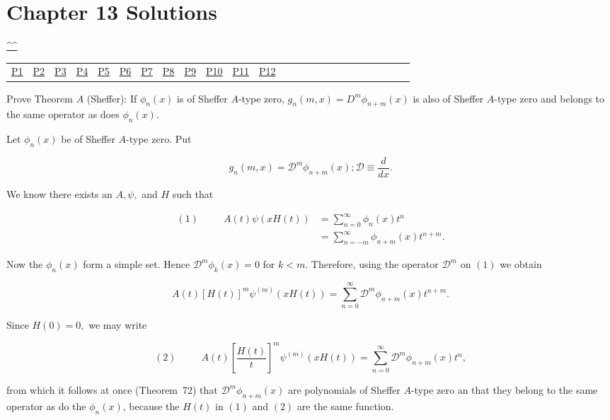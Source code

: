 \section{Chapter 13 Solutions}
\begin{center}\hyperref[toc]{\^{}\^{}}\end{center}
\begin{center}\begin{tabular}{lllllllllllllllllllllllll}
\hyperref[problem1chapter13]{P1} & \hyperref[problem2chapter13]{P2} & \hyperref[problem3chapter13]{P3} & \hyperref[problem4chapter13]{P4} & \hyperref[problem5chapter13]{P5} & \hyperref[problem6chapter13]{P6} & \hyperref[problem7chapter13]{P7} & \hyperref[problem8chapter13]{P8} & \hyperref[problem9chapter13]{P9} & \hyperref[problem10chapter13]{P10} & \hyperref[problem11chapter13]{P11} & \hyperref[problem12chapter13]{P12}
\end{tabular}\end{center}
\setcounter{problem}{0}
\setcounter{solution}{0}
\begin{problem}\label{problem1chapter13}
Prove Theorem $A$ (Sheffer): If $\phi_n(x)$ is of Sheffer $A$-type zero, $g_n(m,x)=D^m \phi_{n+m}(x)$ is also of Sheffer $A$-type zero and belongs to the same operator as does $\phi_n(x)$.
\end{problem}
\begin{solution}
Let $\phi_n(x)$ be of Sheffer $A$-type zero. Put

$$g_n(m,x) = \mathscr{D}^m \phi_{n+m}(x); \mathscr{D} \equiv \dfrac{d}{dx}.$$

We know there exists an $A, \psi,$ and $H$ such that

$$\begin{array}{ll}
(1) \hspace{30pt} A(t) \psi(x H(t)) &= \displaystyle\sum_{n=0}^{\infty} \phi_n(x) t^n \\
&= \displaystyle\sum_{n=-m}^{\infty} \phi_{n+m}(x)t^{n+m}.
\end{array}$$

Now the $\phi_n(x)$ form a simple set. Hence $\mathscr{D}^m\phi_k(x) =0$ for $k<m$. Therefore, using the operator $\mathscr{D}^m$ on $(1)$ we obtain

$$A(t) [H(t)]^m \psi^{(m)}(xH(t)) = \displaystyle\sum_{n=0}^{\infty} \mathscr{D}^m \phi_{n+m}(x) t^{n+m}.$$

Since $H(0)=0,$ we may write

$$(2) \hspace{30pt} A(t) \left[ \dfrac{H(t)}{t} \right]^m \psi^{(m)} (xH(t)) = \displaystyle\sum_{n=0}^{\infty} \mathscr{D}^m \phi_{n+m}(x) t^n,$$

from which it follows at once (Theorem~72) that $\mathscr{D}^m\phi_{n+m}(x)$ are polynomials of Sheffer $A$-type zero an that they belong to the same operator as do the $\phi_n(x)$, because the $H(t)$ in $(1)$ and $(2)$ are the same function.
\end{solution}
